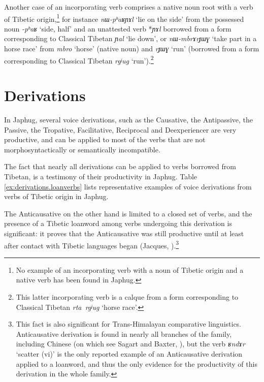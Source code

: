 \documentclass[oneside,a4paper,11pt]{article}
\newcommand{\ipa}[1]{{\phon\textit{\mbox{#1}}}} %
\begin{document}
Another case of an incorporating verb comprises a native noun root with a verb of Tibetic origin,\footnote{No example of an incorporating verb with a noun of Tibetic origin and a native verb has been found in Japhug.} for instance  \ipa{nɯ-pʰaʁɲɤl} `lie on the side' from the possessed noun \ipa{-pʰaʁ} `side, half' and an unattested verb *\ipa{ɲɤl} borrowed from a form corresponding to Classical Tibetan \ipa{ɲal} `lie down', or \ipa{nɯ-mbrɤrɟɯɣ} `take part in a horse race' from \ipa{mbro} `horse' (native noun) and \ipa{rɟɯɣ} `run' (borrowed from a form corresponding to Classical Tibetan \ipa{rgʲug} `run').\footnote{This latter incorporating verb is a calque from a form corresponding to Classical Tibetan \ipa{rta rgʲug} `horse race'.}
  
\section{Derivations}
In Japhug, several voice derivations, such as the Causative, the Antipassive, the Passive, the Tropative, Facilitative, Reciprocal and Deexperiencer are very productive, and can be applied to most of the verbs that are not morphosyntactically or semantically incompatible. 


The fact that nearly all derivations can be applied to verbs borrowed from Tibetan, is a testimony of their productivity in Japhug. Table \ref{ex:derivations.loanverbs} lists representative examples of voice derivations from verbs of Tibetic origin in Japhug.

The Anticausative on the other hand is limited to a closed set of verbs, and the presence of a Tibetic loanword among verbs undergoing this derivation is significant: it proves that the Anticausative was still productive until at least after contact with Tibetic languages began (Jacques, \citeyear{jacques12demotion}).\footnote{This fact is also significant for Trans-Himalayan comparative linguistics. Anticausative derivation is found in nearly all branches of the family, including Chinese (on which see Sagart and Baxter, \citeyear{sagart12sprefix}), but the verb \ipa{ʁndɤr} `scatter (vi)' is the only reported example of an Anticausative derivation applied to a loanword, and thus the only evidence for the productivity of this derivation in the whole family. }
\end{document}
